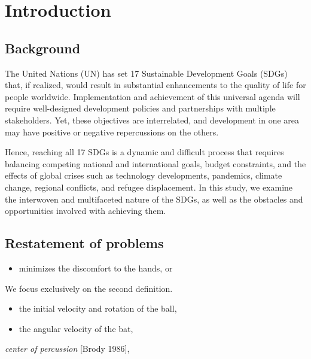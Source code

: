 \documentclass{mcmthesis}
\begin{document}
\thispagestyle{empty}
\newpage
\tableofcontents
\newpage
\setcounter{page}{1}
\section{Introduction}

\subsection{Background}


The United Nations (UN) \cite{fonseca2020mapping} has set 17 Sustainable Development Goals (SDGs) that, if realized, would result in substantial enhancements to the quality of life for people worldwide. Implementation and achievement of this universal agenda will require well-designed development policies and partnerships with multiple stakeholders. Yet, these objectives are interrelated\cite{singh2018rapid}, and development in one area may have positive or negative repercussions on the others. 

Hence, reaching all 17 SDGs is a dynamic and difficult process that requires balancing competing national and international goals, budget constraints, and the effects of global crises such as technology developments, pandemics, climate change, regional conflicts, and refugee displacement\cite{shulla2021effects}. 
In this study, we examine the interwoven and multifaceted nature of the SDGs, as well as the obstacles and opportunities involved with achieving them. 

\subsection{Restatement of problems}


\begin{itemize}
\item minimizes the discomfort to the hands, or
\end{itemize}
We focus exclusively on the second definition.

\begin{itemize}
\item the initial velocity and rotation of the ball,
\end{itemize}

\begin{itemize}
\item the angular velocity of the bat,
\end{itemize}

\emph{center of percussion} [Brody 1986],
\end{document}
